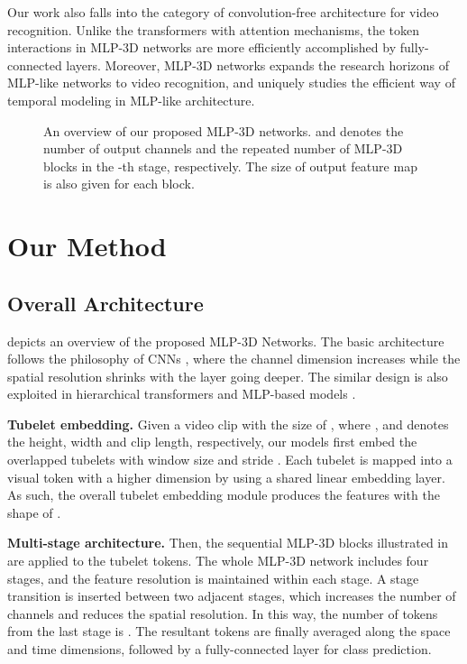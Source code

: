 \documentclass[10pt,twocolumn,letterpaper]{article}
\begin{document}
Our work also falls into the category of convolution-free architecture for video recognition. Unlike the transformers with attention mechanisms, the token interactions in MLP-3D networks are more efficiently accomplished by fully-connected layers. Moreover, MLP-3D networks expands the research horizons of MLP-like networks to video recognition, and uniquely studies the efficient way of temporal modeling in MLP-like architecture.

\begin{figure*}[tb]
   \vspace{-0.1in}
   \caption{\small An overview of our proposed MLP-3D networks.  and  denotes the number of output channels and the repeated number of MLP-3D blocks in the -th stage, respectively. The size of output feature map is also given for each block.}
   \label{fig:framework}
   \vspace{-0.2in}
\end{figure*}

\section{Our Method}
\subsection{Overall Architecture}
 depicts an overview of the proposed MLP-3D Networks. The basic architecture follows the philosophy of CNNs \cite{simonyan2014very,he2015deep}, where the channel dimension increases while the spatial resolution shrinks with the layer going deeper. The similar design is also exploited in hierarchical transformers \cite{liu2021swin,wang2021pyramid} and MLP-based models \cite{yu2021s,chen2021cyclemlp}.

\textbf{Tubelet embedding.} Given a video clip with the size of , where ,  and  denotes the height, width and clip length, respectively, our models first embed the overlapped tubelets with window size  and stride . Each tubelet is mapped into a visual token with a higher dimension  by using a shared linear embedding layer. As such, the overall tubelet embedding module produces the features with the shape of .

\textbf{Multi-stage architecture.} Then, the sequential MLP-3D blocks illustrated in  are applied to the tubelet tokens. The whole MLP-3D network includes four stages, and the feature resolution is maintained within each stage. A stage transition is inserted between two adjacent stages, which increases the number of channels and reduces the spatial resolution. In this way, the number of tokens from the last stage is . The resultant tokens are finally averaged along the space and time dimensions, followed by a fully-connected layer for class prediction.
\end{document}
